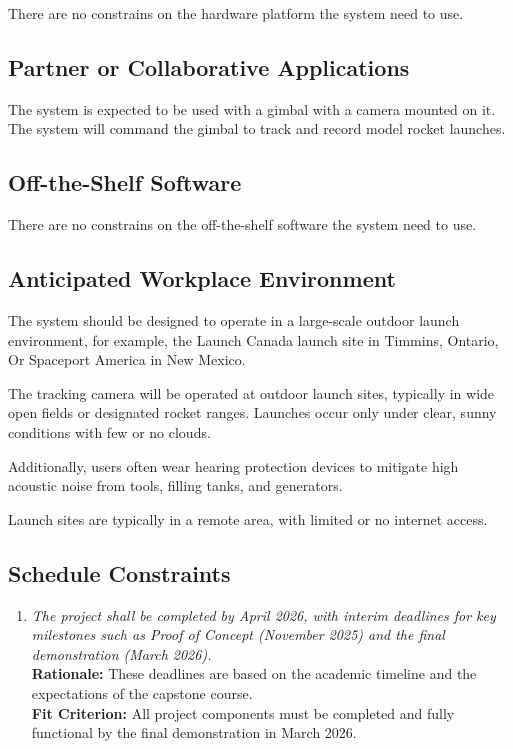 \documentclass[12pt]{article}
\begin{document}
There are no constrains on the hardware platform the system need to use.

\subsection{Partner or Collaborative Applications}

The system is expected to be used with a gimbal with a camera mounted on it.
The system will command the gimbal to track and record model rocket launches.

\subsection{Off-the-Shelf Software}

There are no constrains on the off-the-shelf software the system need to use.

\subsection{Anticipated Workplace Environment}

The system should be designed to operate in a large-scale outdoor launch
environment, for example, the Launch Canada launch site in Timmins, Ontario, Or
Spaceport America in New Mexico.

The tracking camera will be operated at outdoor launch sites, typically in wide
open fields or designated rocket ranges. Launches occur only under clear, sunny
conditions with few or no clouds.

Additionally, users often wear hearing protection devices to mitigate high
acoustic noise from tools, filling tanks, and generators.

Launch sites are typically in a remote area, with limited or no internet
access.

\subsection{Schedule Constraints}

\begin{enumerate}[label=SCHD \arabic*., wide=0pt, leftmargin=*]
  \item \emph{The project shall be completed by April 2026, with
          interim deadlines for key milestones such as Proof of Concept
          (November 2025) and the final demonstration (March 2026).}\\[2mm]
        {\bf Rationale:} These deadlines are based on the academic
        timeline and the expectations of the capstone course.\\
        {\bf Fit Criterion:} All project components must be completed and
        fully functional by the final demonstration in March 2026.
\end{enumerate}
\end{document}
